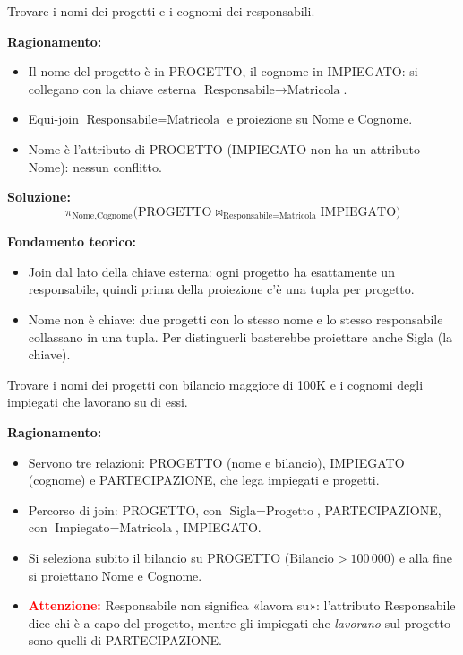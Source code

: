 \documentclass[12pt, a4paper]{article}
\begin{document}
\begin{tcolorbox}[colback=lightergray!10, colframe=tocsec, title=\textbf{Esercizio 1.5}]
Trovare i nomi dei progetti e i cognomi dei responsabili.
\end{tcolorbox}

\textbf{Ragionamento:}
\begin{itemize}
\item Il nome del progetto è in PROGETTO, il cognome in IMPIEGATO: si collegano con la chiave esterna $\text{Responsabile}\to\text{Matricola}$.
\item Equi-join $\text{Responsabile}=\text{Matricola}$ e proiezione su Nome e Cognome.
\item Nome è l'attributo di PROGETTO (IMPIEGATO non ha un attributo Nome): nessun conflitto.
\end{itemize}

\textbf{Soluzione:}
$$\pi_{\text{Nome},\text{Cognome}}\big(\text{PROGETTO}\bowtie_{\text{Responsabile}=\text{Matricola}}\text{IMPIEGATO}\big)$$

\textbf{Fondamento teorico:}
\begin{itemize}
\item Join dal lato della chiave esterna: ogni progetto ha esattamente un responsabile, quindi prima della proiezione c'è una tupla per progetto.
\item Nome non è chiave: due progetti con lo stesso nome e lo stesso responsabile collassano in una tupla. Per distinguerli basterebbe proiettare anche Sigla (la chiave).
\end{itemize}

\begin{tcolorbox}[colback=lightergray!10, colframe=tocsec, title=\textbf{Esercizio 1.6}]
Trovare i nomi dei progetti con bilancio maggiore di 100K e i cognomi degli impiegati che lavorano su di essi.
\end{tcolorbox}

\textbf{Ragionamento:}
\begin{itemize}
\item Servono tre relazioni: PROGETTO (nome e bilancio), IMPIEGATO (cognome) e PARTECIPAZIONE, che lega impiegati e progetti.
\item Percorso di join: PROGETTO, con $\text{Sigla}=\text{Progetto}$, PARTECIPAZIONE, con $\text{Impiegato}=\text{Matricola}$, IMPIEGATO.
\item Si seleziona subito il bilancio su PROGETTO ($\text{Bilancio}>100\,000$) e alla fine si proiettano Nome e Cognome.
\item \textcolor{red}{\textbf{Attenzione:}} Responsabile non significa «lavora su»: l'attributo Responsabile dice chi è a capo del progetto, mentre gli impiegati che \emph{lavorano} sul progetto sono quelli di PARTECIPAZIONE.
\end{itemize}
\end{document}
